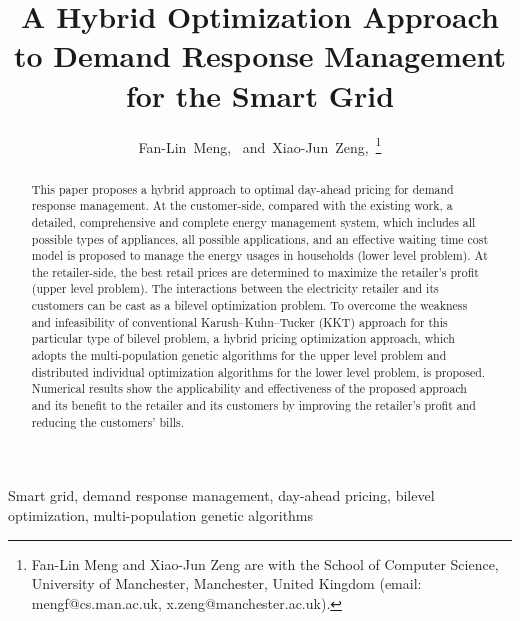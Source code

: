 \documentclass[10pt,journal]{IEEEtran}
\theoremstyle{definition}
\theoremstyle{plain} \newtheorem{theo}{Theorem} \newtheorem{prop}{Proposition}  \newtheorem{lemm}{Lemma}
\begin{document}
\title{A Hybrid Optimization Approach to Demand Response Management for the Smart Grid}


\author{Fan-Lin~Meng,~
        and~Xiao-Jun~Zeng,~\thanks{Fan-Lin Meng and Xiao-Jun Zeng are with the School of Computer Science, University of Manchester, Manchester, United Kingdom (email: mengf@cs.man.ac.uk, x.zeng@manchester.ac.uk).}}



















\maketitle

\begin{abstract}





This paper proposes a hybrid approach to optimal day-ahead pricing for demand response management. At the customer-side, compared with the existing work, a detailed, comprehensive and complete energy management system, which includes all possible types of appliances, all possible applications, and an effective waiting time cost model is proposed to manage the energy usages in households (lower level problem). At the retailer-side, the best retail prices are determined to maximize the retailer's profit (upper level problem). The interactions between the electricity retailer and its customers can be cast as a bilevel optimization problem. To overcome the weakness and infeasibility of conventional Karush--Kuhn--Tucker (KKT) approach for this particular type of bilevel problem, a hybrid pricing optimization approach, which adopts the multi-population genetic algorithms for the upper level problem and distributed individual optimization algorithms for the lower level problem, is proposed. Numerical results show the applicability and effectiveness of the proposed approach and its  benefit to  the retailer and its customers by improving the retailer's profit and reducing the customers' bills.
\end{abstract}

\begin{IEEEkeywords}
Smart grid, demand response management, day-ahead pricing, bilevel optimization, multi-population genetic algorithms
\end{IEEEkeywords}
\end{document}
